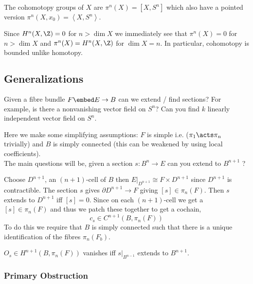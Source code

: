 \documentclass[12pt]{extarticle}
\begin{document}
\begin{definition}
The cohomotopy groups of $X$ are $\pi^n(X) = [X, S^n]$ which also have a pointed version $\pi^n(X, x_0) = \left< X, S^n \right>$. 
\end{definition}

\begin{rmk}
Since $H^n(X, \Z) = 0$ for $n > \dim{X}$ we immediately see that $\pi^n(X) = 0$ for $n > \dim{X}$ and $\pi^n(X) = H^n(X, \Z)$ for $\dim{X} = n$. In particular, cohomotopy is bounded unlike homotopy. 
\end{rmk}

\subsection{Generalizations}

\begin{rmk}
Given a fibre bundle $F \embed E \to B$ can we extend / find sections? For example, is there a nonvanishing vector field on $S^n$? Can you find $k$ linearly independent vector field on $S^n$. 
\end{rmk}

\begin{rmk}
Here we make some simplifying assumptions: $F$ is simple i.e. ($\pi_1 \acts \pi_n$ trivially) and $B$ is simply connected (this can be weakened by using local coefficients).  
\bigskip\\
The main questions will be, given a section $s : B^n \to E$ can you extend to $B^{n+1}$ ?
\end{rmk}

Choose $D^{n+1}$, an $(n+1)$-cell of $B$ then $E|_{D^{n+1}} \cong F \times D^{n+1}$ since $D^{n+1}$ is contractible. The section $s$ gives $\partial D^{n+1} \to F$ giving $[s] \in \pi_n(F)$. Then $s$ extends to $D^{n+1}$ iff $[s] = 0$. Since on each $(n+1)$-cell we get a $[s] \in \pi_n(F)$ and thus we patch these together to get a cochain,
\[ c_s \in C^{n+1}(B, \pi_n(F)) \]
To do this we require that $B$ is simply connected such that there is a unique identification of the fibres $\pi_n(F_b)$. 

\begin{thm}
$O_s \in H^{n+1}(B, \pi_n(F))$ vanishes iff $s|_{B^{n-1}}$ extends to $B^{n+1}$. 
\end{thm}

\subsubsection{Primary Obstruction}
\end{document}
